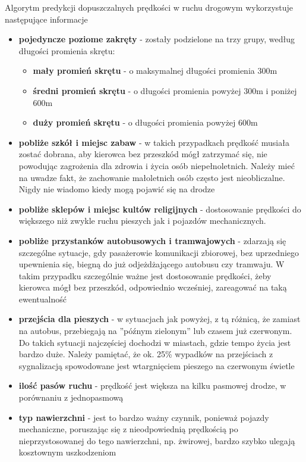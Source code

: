 Algorytm predykcji dopuszczalnych prędkości w ruchu drogowym wykorzystuje następujące informacje

\begin{itemize}
\item \textbf{pojedyncze poziome zakręty} - zostały podzielone na trzy grupy, według długości promienia skrętu:
 \begin{itemize}
 	\item \textbf{mały promień skrętu} - o maksymalnej długości promienia 300m
 	\item \textbf{średni promień skrętu} - o długości promienia powyżej 300m i poniżej 600m
 	\item \textbf{duży promień skrętu} - o długości promienia powyżej 600m
 \end{itemize}
\item \textbf{pobliże szkół i miejsc zabaw} - w takich przypadkach prędkość musiała zostać dobrana, aby kierowca bez przeszkód mógł zatrzymać się, nie powodując zagrożenia dla zdrowia i życia osób niepełnoletnich. Należy mieć na uwadze fakt, że zachowanie małoletnich osób często jest nieobliczalne. Nigdy nie wiadomo kiedy mogą pojawić się na drodze
\item \textbf{pobliże sklepów i miejsc kultów religijnych} - dostosowanie prędkości do większego niż zwykle ruchu pieszych jak i pojazdów mechanicznych.
\item \textbf{pobliże przystanków autobusowych i tramwajowych} - zdarzają się szczególne sytuacje, gdy pasażerowie komunikacji zbiorowej, bez uprzedniego upewnienia się, biegną  do już odjeżdżającego autobusu czy tramwaju. W takim przypadku szczególnie ważne jest dostosowanie prędkości, żeby kierowca mógł bez przeszkód, odpowiednio wcześniej, zareagować na taką ewentualność
\item \textbf{przejścia dla pieszych} - w sytuacjach jak powyżej, z tą różnicą, że zamiast na autobus, przebiegają na ''późnym zielonym'' lub czasem już czerwonym. Do takich sytuacji najczęściej dochodzi w miastach, gdzie tempo życia jest bardzo duże. Należy pamiętać, że ok. 25\% wypadków na przejściach z sygnalizacją spowodowane jest wtargnięciem pieszego na czerwonym świetle
\item \textbf{ilość pasów ruchu} - prędkość jest większa na kilku pasmowej drodze, w porównaniu z jednopasmową
\item \textbf{typ nawierzchni} - jest to bardzo ważny czynnik, ponieważ pojazdy mechaniczne, poruszając się z nieodpowiednią prędkością po nieprzystosowanej do tego nawierzchni, np. żwirowej, bardzo szybko ulegają kosztownym uszkodzeniom

\end{itemize}
